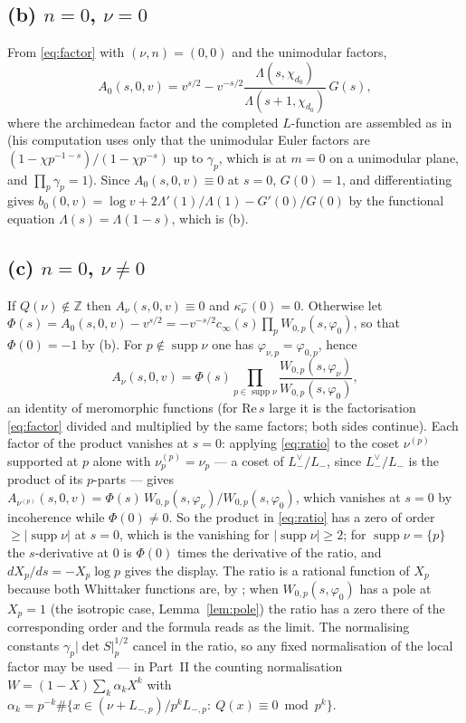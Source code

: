 \documentclass[11pt,reqno]{amsart}
\theoremstyle{plain}
\theoremstyle{definition}
\DeclareMathOperator{\supp}{supp}
\newcommand{\Z}{\mathbb{Z}}
\newcommand{\Lm}{L_{-}}
\begin{document}
\subsection*{(b) $n=0$, $\nu=0$}
From \eqref{eq:factor} with $(\nu,n)=(0,0)$ and the unimodular factors,
\[
  A_0(s,0,v)=v^{s/2}-v^{-s/2}\frac{\Lambda(s,\chi_{d_0})}{\Lambda(s+1,\chi_{d_0})}\,G(s),
\]
where the archimedean factor and the completed $L$-function are assembled as in \cite[(14)]{Yang}
(his computation uses only that the unimodular Euler factors are $(1-\chi p^{-1-s})/(1-\chi p^{-s})$
up to $\gamma_p$, which is \cite[Thm.~4.3]{KY} at $m=0$ on a unimodular plane, and
$\prod_p\gamma_p=1$). Since $A_0(s,0,v)\equiv0$ at $s=0$, $G(0)=1$, and differentiating gives
$b_0(0,v)=\log v+2\Lambda'(1)/\Lambda(1)-G'(0)/G(0)$ by the functional equation
$\Lambda(s)=\Lambda(1-s)$, which is (b).

\subsection*{(c) $n=0$, $\nu\neq0$}
If $Q(\nu)\notin\Z$ then $A_\nu(s,0,v)\equiv0$ and $\kappa^-_\nu(0)=0$. Otherwise let
$\Phi(s)=A_0(s,0,v)-v^{s/2}=-v^{-s/2}c_\infty(s)\prod_pW_{0,p}(s,\varphi_0)$, so that $\Phi(0)=-1$
by (b). For $p\notin\supp\nu$ one has $\varphi_{\nu,p}=\varphi_{0,p}$, hence
\begin{equation}\label{eq:ratio}
  A_\nu(s,0,v)=\Phi(s)\prod_{p\in\supp\nu}\frac{W_{0,p}(s,\varphi_\nu)}{W_{0,p}(s,\varphi_0)},
\end{equation}
an identity of meromorphic functions (for $\mathrm{Re}\,s$ large it is the factorisation
\eqref{eq:factor} divided and multiplied by the same factors; both sides continue). Each factor of
the product vanishes at $s=0$: applying \eqref{eq:ratio} to the coset $\nu^{(p)}$ supported at
$p$ alone with $\nu^{(p)}_p=\nu_p$ --- a coset of $\Lm^\vee/\Lm$, since $\Lm^\vee/\Lm$ is the
product of its $p$-parts --- gives $A_{\nu^{(p)}}(s,0,v)=\Phi(s)\,W_{0,p}(s,\varphi_\nu)/
W_{0,p}(s,\varphi_0)$, which vanishes at $s=0$ by incoherence while $\Phi(0)\neq0$. So the product
in \eqref{eq:ratio} has a zero of order $\ge|\supp\nu|$ at $s=0$, which is the vanishing for
$|\supp\nu|\ge2$; for $\supp\nu=\{p\}$ the $s$-derivative at $0$ is $\Phi(0)$ times the derivative
of the ratio, and $dX_p/ds=-X_p\log p$ gives the display. The ratio is a rational function of
$X_p$ because both Whittaker functions are, by \cite[Thms.~4.3, 4.4]{KY}; when
$W_{0,p}(s,\varphi_0)$ has a pole at $X_p=1$ (the isotropic case, Lemma~\ref{lem:pole}) the ratio
has a zero there of the corresponding order and the formula reads as the limit. The normalising
constants $\gamma_p|\det S|_p^{1/2}$ cancel in the ratio, so any fixed normalisation of the local
factor may be used --- in Part~II the counting normalisation $W=(1-X)\sum_k\alpha_kX^k$ with
$\alpha_k=p^{-k}\#\{x\in(\nu+L_{-,p})/p^kL_{-,p}:\ Q(x)\equiv0\bmod p^k\}$.
\end{document}
